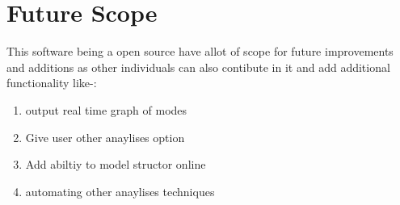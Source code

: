 \section{Future Scope}
This software being a open source have allot of scope for future improvements
and additions as other individuals can also contibute in it and add additional functionality 
like-:
\begin{enumerate}
\item output real time graph of modes 
\item Give user other anaylises option 
\item Add abiltiy to model structor online
\item automating other anaylises techniques
\end{enumerate} 
